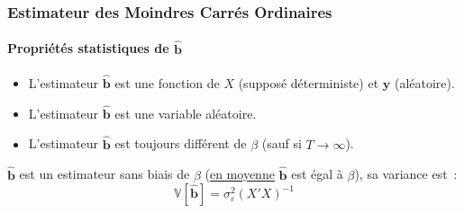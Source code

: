 \documentclass[10pt]{beamer}
\begin{document}
\begin{frame}
  \frametitle{Estimateur des Moindres Carrés Ordinaires}
  \framesubtitle {Propriétés statistiques de $\hat{\mathbf b}$}

  \begin{itemize}

  \item L'estimateur $\hat{\mathbf b}$ est une fonction de $X$ (supposé déterministe) et $\mathbf y$ (aléatoire).\newline

  \item[$\Rightarrow$] L'estimateur $\hat{\mathbf b}$ est une variable aléatoire.\newline

  \item[$\Rightarrow$] L'estimateur $\hat{\mathbf b}$ est toujours différent de $\beta$ (sauf si $T\rightarrow\infty$).\newline

  \end{itemize}


  \begin{prop}\label{prop:biais-variance}
    $\hat{\mathbf b}$ est un estimateur sans biais de $\beta$ (\underline{en moyenne} $\hat{\mathbf b}$ est égal à $\beta$), sa variance est~:
    \[
      \mathbb V \left[ \hat{\mathbf b} \right] = \sigma_{\varepsilon}^2(X'X)^{-1}
    \]
  \end{prop}

\end{frame}
\end{document}
